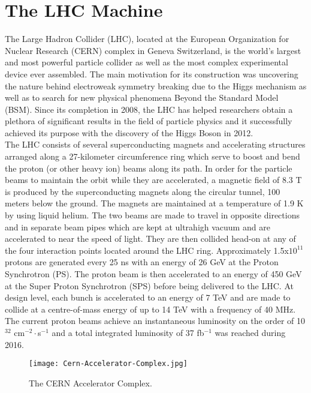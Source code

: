\section{The LHC Machine}

The Large Hadron Collider (LHC)\cite{LHC}, located at the European Organization for Nuclear Research (CERN) complex in Geneva Switzerland, is the world's largest and most powerful particle collider as well as the most complex experimental device ever assembled. The main motivation for its construction was uncovering the nature behind electroweak symmetry breaking due to the Higgs mechanism as well as to search for new physical phenomena Beyond the Standard Model (BSM)\cite{BSM}. Since its completion in 2008, the LHC has helped researchers obtain a plethora of significant results in the field of particle physics and it successfully achieved its purpose with the discovery of the Higgs Boson in 2012.\\

The LHC consists of several superconducting magnets and accelerating structures arranged along a 27-kilometer circumference ring which serve to boost and bend the proton (or other heavy ion) beams along its path. In order for the particle beams to maintain the orbit while they are accelerated, a magnetic field of 8.3 T is produced by the superconducting magnets along the circular tunnel, 100 meters below the ground. The magnets are maintained at a temperature of 1.9 K by using liquid helium. The two beams are made to travel in opposite directions and in separate beam pipes which are kept at ultrahigh vacuum and are accelerated to near the speed of light. They are then collided head-on at any of the four interaction points located around the LHC ring. Approximately 1.5x$10^{11}$ protons are generated every 25 ns with an energy of 26 GeV at the Proton Synchrotron (PS). The proton beam is then accelerated to an energy of 450 GeV at the Super Proton Synchrotron (SPS)\cite{SPS} before being delivered to the LHC. At design level, each bunch is accelerated to an energy of 7 TeV and are made to collide at a centre-of-mass energy of up to 14 TeV with a frequency of 40 MHz.  The current proton beams achieve an instantaneous luminosity on the order of 10$^{32}$ cm$^{-2}\cdot$s${^{-1}}$ and a total integrated luminosity of 37 fb$^{-1}$ was reached during 2016\cite{CMSLHC}.\\

\begin{figure}[tb]
\begin{center}
\texttt{[image: Cern-Accelerator-Complex.jpg]} 
\caption{The CERN Accelerator Complex\cite{LHCcomplex}.}
\label{Cern-Accelerator-Complex.jpg} 
\hspace{4em}
\end{center}
\end{figure}

